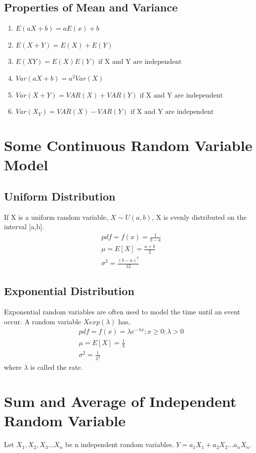 \documentclass{article}
\begin{document}
    \subsection*{Properties of Mean and Variance}
    \begin{enumerate}
        \item $E(aX+b) = aE(x) + b$
        \item $E(X+Y) = E(X) + E(Y)$
        \item $E(XY) = E(X)E(Y) \text{ if X and Y are independent}$
        \item $Var(aX + b) = a^{2} Var(X)$
        \item $Var(X+Y) = VAR(X)+ VAR(Y) \text{ if X and Y are independent}$
        \item $Var(X_Y) = VAR(X) - VAR(Y) \text{ if X and Y are independent}$
    \end{enumerate}

    \section*{Some Continuous Random Variable Model}
    \subsection*{Uniform Distribution}
    If X is a uniform random variable, $X\sim U(a, b)$, X is evenly distributed on the interval [a,b].
    \begin{align*}
        &pdf = f(x) = \frac{1}{b-a}\\
        &\mu = E[X] = \frac{a+b}{2}\\
        &\sigma^{2} = \frac{(b-a)^{2}}{12}
    \end{align*}
    \subsection*{Exponential Distribution}
    Exponential random variables are often used to model the time until an event occur. A random variable $X exp(\lambda)$ has,
    \begin{align*}
        &pdf = f(x) = \lambda e^{-\lambda x}; x \geq 0 ; \lambda > 0\\
        &\mu = E[X] = \frac{1}{\lambda}\\
        &\sigma^{2} = \frac{1}{\lambda^{2}}
    \end{align*}
    where $\lambda$ is called the rate.
    
    \section*{Sum and Average of Independent Random Variable} 
        Let $X_{1}, X_{2}, X_{3}... X_{n}$ be n independent random variables. 
        $Y = a_{1}X_{1} + a_{2}X_{2}...a_{n}X_{n}$. \newline
\end{document}
